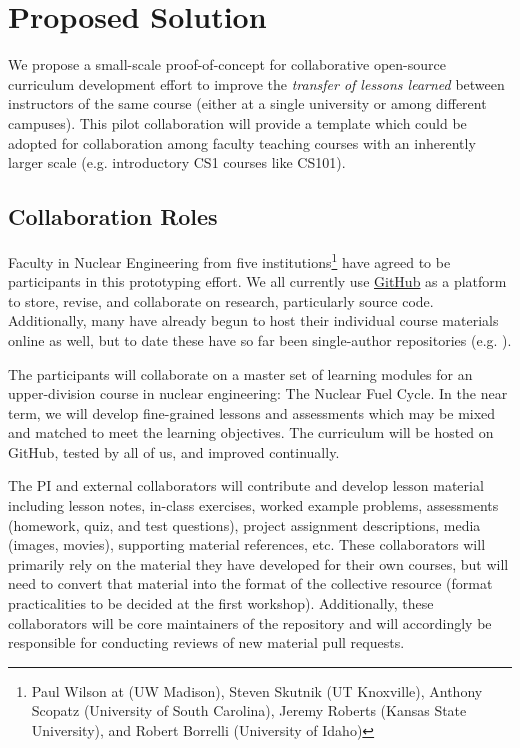 \documentclass[11pt]{article}
\begin{document}
          \section{Proposed Solution}
          We propose a small-scale proof-of-concept for collaborative
          open-source curriculum development effort to improve the \emph{transfer of lessons 
          learned} between instructors of the same course (either at a single 
          university or among different campuses). This pilot collaboration 
          will provide a template which could be adopted for collaboration 
          among faculty teaching courses with an inherently larger scale (e.g. 
          introductory CS1 courses like CS101).

          \subsection{Collaboration Roles}
          Faculty in Nuclear Engineering from five institutions\footnote{
          Paul Wilson at (UW Madison), 
          Steven Skutnik (UT Knoxville), 
          Anthony Scopatz (University of South Carolina), 
          Jeremy Roberts (Kansas State University), 
          and Robert Borrelli (University of Idaho)
          } have agreed to be participants in 
          this prototyping effort. We all currently use 
          \href{https://github.com}{GitHub} as a platform to store, 
          revise, and collaborate on research, particularly source code. 
          Additionally, many have already begun to host their individual course 
          materials online as well, but to date these have so far been single-author 
          repositories (e.g. \cite{huff_npre412_2017}).

          The participants will collaborate on a master set of learning 
          modules for an upper-division course in nuclear engineering: 
          The Nuclear Fuel Cycle. In the near term, we will develop 
          fine-grained lessons and assessments which may be mixed and matched 
          to meet the learning objectives. The curriculum will be hosted on 
          GitHub, tested by all of us, and improved continually.
          
          The PI and external collaborators will contribute and develop lesson 
          material including lesson notes, in-class exercises, worked example 
          problems, assessments (homework, quiz, and test questions), project 
          assignment descriptions, media (images, movies), supporting material 
          references, etc. These collaborators will primarily rely on the 
          material they have developed for their own courses, but will need to 
          convert that material into the format of the collective resource 
          (format practicalities to be decided at the first workshop). Additionally, these 
          collaborators will be core maintainers of the repository and will 
          accordingly be responsible for conducting reviews of new material 
          pull requests.
\end{document}
